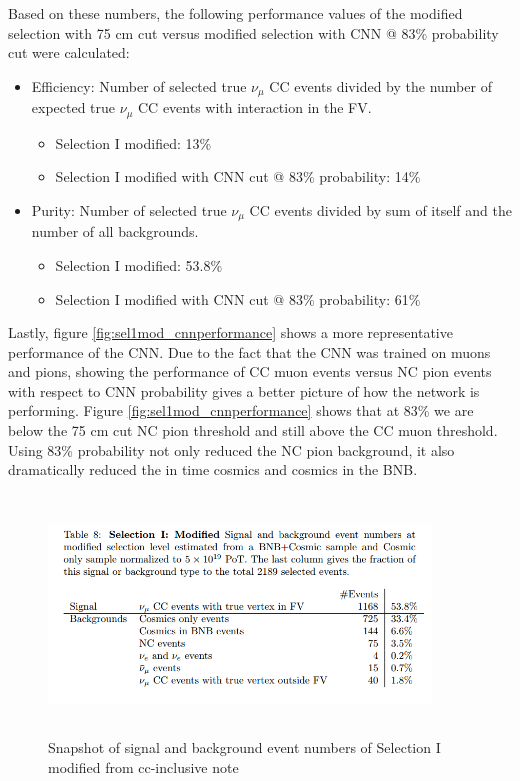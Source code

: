 Based on these numbers, the following performance values of the modified selection with 75 cm cut versus modified selection with CNN @ 83\% probability cut were calculated:
\begin{itemize}
\item Efficiency: Number of selected true $\nu_{\mu}$ CC events divided by the number of expected true $\nu_{\mu}$ CC events with interaction in the FV.
\begin{itemize}
\item Selection I modified: 13\% 
\item Selection I modified with CNN cut @ 83\% probability: 14\% 
\end{itemize}
\item Purity: Number of selected true $\nu_{\mu}$ CC events divided by sum of itself and the number of all backgrounds.
\begin{itemize}
\item Selection I modified: 53.8\% 
\item Selection I modified with CNN cut @ 83\% probability: 61\% 
\end{itemize}
\end{itemize}

Lastly, figure \ref{fig:sel1mod_cnnperformance} shows a more representative performance of the CNN. Due to the fact that the CNN was trained on muons and pions, showing the performance of CC muon events versus NC pion events with respect to CNN probability gives a better picture of how the network is performing. Figure \ref{fig:sel1mod_cnnperformance} shows that at 83\% we are below the 75 cm cut NC pion threshold and still above the CC muon threshold. Using 83\% probability not only reduced the NC pion background, it also dramatically reduced the in time cosmics and cosmics in the BNB. 

\begin{figure}[htp!]
\centering
\includegraphics[width=4in,height=2.5in]{figs/purity_sel1mod.png}
\caption{Snapshot of signal and background event numbers of Selection I modified from cc-inclusive note \cite{cc-inclusive}}
\label{fig:pur_sel1mod}
\end{figure}

